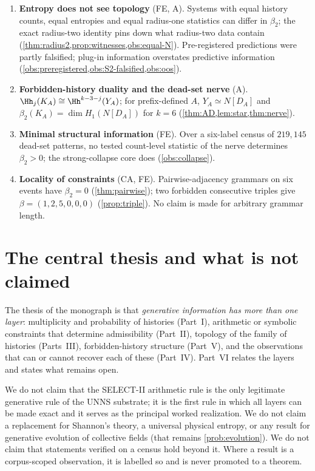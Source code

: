 \begin{enumerate}[label=\textbf{R\arabic*.},leftmargin=2.6em]
\item \textbf{Entropy does not see topology} (\textsf{FE}, \textsf{A}). Systems with equal history counts, equal entropies and equal radius-one statistics can differ in $\beta_2$; the exact radius-two identity pins down what radius-two data contain (\cref{thm:radius2,prop:witnesses,obs:equal-N}). Pre-registered predictions were partly falsified; plug-in information overstates predictive information (\cref{obs:preregistered,obs:S2-falsified,obs:oos}).
\item \textbf{Forbidden-history duality and the dead-set nerve} (\textsf{A}). $\Hh_j(K_A)\cong\Hh^{k-3-j}(Y_A)$; for prefix-defined $A$, $Y_A\simeq N[D_A]$ and $\beta_2(K_A)=\dim H_1(N[D_A])$ for $k=6$ (\cref{thm:AD,lem:star,thm:nerve}).
\item \textbf{Minimal structural information} (\textsf{FE}). Over a six-label census of $219{,}145$ dead-set patterns, no tested count-level statistic of the nerve determines $\beta_2>0$; the strong-collapse core does (\cref{obs:collapse}).
\item \textbf{Locality of constraints} (\textsf{CA}, \textsf{FE}). Pairwise-adjacency grammars on six events have $\beta_2=0$ (\cref{thm:pairwise}); two forbidden consecutive triples give $\beta=(1,2,5,0,0,0)$ (\cref{prop:triple}). No claim is made for arbitrary grammar length.
\end{enumerate}

\section{The central thesis and what is not claimed}
The thesis of the monograph is that \emph{generative information has more than one layer}: multiplicity and probability of histories (Part~I), arithmetic or symbolic constraints that determine admissibility (Part~II), topology of the family of histories (Parts~III), forbidden-history structure (Part~V), and the observations that can or cannot recover each of these (Part~IV). Part~VI relates the layers and states what remains open.

We do not claim that the SELECT-II arithmetic rule is the only legitimate generative rule of the UNNS substrate; it is the first rule in which all layers can be made exact and it serves as the principal worked realization. We do not claim a replacement for Shannon's theory, a universal physical entropy, or any result for generative evolution of collective fields (that remains \cref{prob:evolution}). We do not claim that statements verified on a census hold beyond it. Where a result is a corpus-scoped observation, it is labelled so and is never promoted to a theorem.

